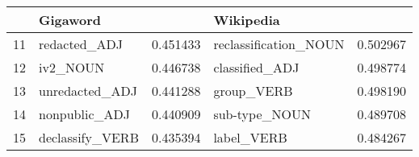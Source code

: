 \begin{tabular}{llrlr}
\toprule
{} &         Gigaword  & &              Wikipedia &   \\
\midrule
11 &     redacted\_ADJ &         0.451433 &  reclassification\_NOUN &          0.502967 \\
12 &         iv2\_NOUN &         0.446738 &         classified\_ADJ &          0.498774 \\
13 &   unredacted\_ADJ &         0.441288 &             group\_VERB &          0.498190 \\
14 &    nonpublic\_ADJ &         0.440909 &          sub-type\_NOUN &          0.489708 \\
15 &  declassify\_VERB &         0.435394 &             label\_VERB &          0.484267 \\
\bottomrule
\end{tabular}
